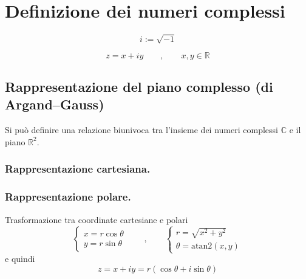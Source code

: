 
\section{Definizione dei numeri complessi}
\begin{definition} 
 \begin{equation}
   i := \sqrt{-1}
 \end{equation}
\end{definition}

\begin{definition}
\begin{equation}
  z = x + i y \qquad , \qquad x,y \in \mathbb{R}
\end{equation}
\end{definition}


\subsection{Rappresentazione del piano complesso (di Argand--Gauss)}
Si può definire una relazione biunivoca tra l'insieme dei numeri complessi $\mathbb{C}$ e il piano $\mathbb{R}^2$.

\subsubsection{Rappresentazione cartesiana.}

\subsubsection{Rappresentazione polare.}
Trasformazione tra coordinate cartesiane e polari
\begin{equation}
\begin{cases}
  x = r \cos \theta \\
  y = r \sin \theta
\end{cases} \qquad , \qquad
\begin{cases}
  r = \sqrt{x^2 + y^2} \\
  \theta = \text{atan2}(x,y)
\end{cases}
\end{equation}
e quindi
\begin{equation}
  z = x + i y = r \left( \cos \theta + i \sin \theta \right)
\end{equation}

